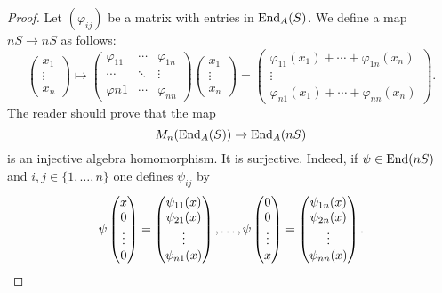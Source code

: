 \begin{proof}
	Let $(\varphi_{ij})$ be a matrix with entries in $\operatorname{End}_A(S)$. We define a map
	$nS\to nS$ as follows:
	\[
	\begin{pmatrix}
	x_1\\
	\vdots\\
	x_n	
	\end{pmatrix}
	\mapsto 
		\begin{pmatrix}
			\varphi_{11} & \cdots & \varphi_{1n}\\
			\cdots & \ddots & \vdots\\
			\varphi{n1} & \cdots & \varphi_{nn}
		\end{pmatrix}
		\begin{pmatrix}
		x_1\\
		\vdots\\
		x_n	
		\end{pmatrix}
		=\begin{pmatrix}
			\varphi_{11}(x_1)+\cdots+\varphi_{1n}(x_n)\\
			\vdots\\
			\varphi_{n1}(x_1)+\cdots+\varphi_{nn}(x_n)
		\end{pmatrix}.
	\]
	The reader should prove that the map  
	\[
		M_n(\operatorname{End}_A(S))\to\operatorname{End}_A(nS)
	\]
	is an injective algebra homomorphism. 
	It is surjective. Indeed, if $\psi\in\operatorname{End}(nS)$ and 
	$i,j\in\{1,\dots,n\}$ one defines $\psi_{ij}$ by 
	\[
		\psi\begin{pmatrix}
		x\\
		0\\
		\vdots\\
		0	
		\end{pmatrix}
		=\begin{pmatrix}
		\psi_{11}(x)\\
		\psi_{21}(x)\\
		\vdots\\
		\psi_{n1}(x)
		\end{pmatrix},\dots,
		\psi\begin{pmatrix}
		0\\
		0\\
		\vdots\\
		x	
		\end{pmatrix}
		=\begin{pmatrix}
		\psi_{1n}(x)\\
		\psi_{2n}(x)\\
		\vdots\\
		\psi_{nn}(x)
		\end{pmatrix}.\qedhere
	\]
\end{proof}

